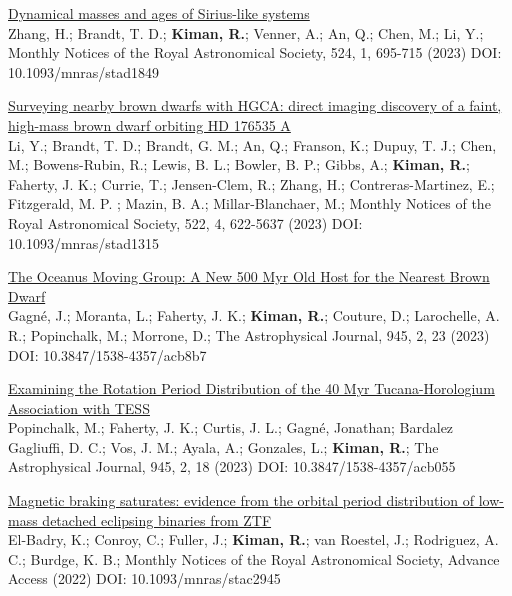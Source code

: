 \documentclass[10pt]{cv}
\begin{document}
\begin{llist}
\begin{etaremune}
 \item \href{https://ui.adsabs.harvard.edu/abs/2023MNRAS.524..695Z/abstract}{Dynamical masses and ages of Sirius-like systems} \\ Zhang, H.; Brandt, T. D.; \textbf{Kiman, R.}; Venner, A.; An, Q.; Chen, M.; Li, Y.; Monthly Notices of the Royal Astronomical Society, 524, 1, 695-715 (2023) DOI: 10.1093/mnras/stad1849

 \item \href{https://ui.adsabs.harvard.edu/abs/2023MNRAS.522.5622L/abstract}{Surveying nearby brown dwarfs with HGCA: direct imaging discovery of a faint, high-mass brown dwarf orbiting HD 176535 A} \\ Li, Y.; Brandt, T. D.; Brandt, G. M.; An, Q.; Franson, K.; Dupuy, T. J.; Chen, M.; Bowens-Rubin, R.; Lewis, B. L.; Bowler, B. P.; Gibbs, A.; \textbf{Kiman, R.}; Faherty, J. K.; Currie, T.; Jensen-Clem, R.; Zhang, H.; Contreras-Martinez, E.; Fitzgerald, M. P. ; Mazin, B. A.; Millar-Blanchaer, M.; Monthly Notices of the Royal Astronomical Society, 522, 4, 622-5637 (2023) DOI: 10.1093/mnras/stad1315

 \item \href{https://ui.adsabs.harvard.edu/abs/2023ApJ...945..119G/abstract}{The Oceanus Moving Group: A New 500 Myr Old Host for the Nearest Brown Dwarf} \\ Gagn\'e, J.; Moranta, L.; Faherty, J. K.; \textbf{Kiman, R.}; Couture, D.; Larochelle, A. R.; Popinchalk, M.; Morrone, D.; The Astrophysical Journal, 945, 2, 23 (2023) DOI: 10.3847/1538-4357/acb8b7

  \item \href{https://ui.adsabs.harvard.edu/abs/2023ApJ...945..114P/abstract}{Examining the Rotation Period Distribution of the 40 Myr Tucana-Horologium Association with TESS} \\ Popinchalk, M.; Faherty, J. K.; Curtis, J. L.; Gagn\'e, Jonathan; Bardalez Gagliuffi, D. C.; Vos, J. M.; Ayala, A.; Gonzales, L.; \textbf{Kiman, R.}; The Astrophysical Journal, 945, 2, 18 (2023) DOI: 10.3847/1538-4357/acb055

  \item \href{https://ui.adsabs.harvard.edu/abs/2022MNRAS.tmp.2758E/abstract}{Magnetic braking saturates: evidence from the orbital period distribution of low-mass detached eclipsing binaries from ZTF}\\ El-Badry, K.; Conroy, C.; Fuller, J.; \textbf{Kiman, R.}; van Roestel, J.; Rodriguez, A. C.; Burdge, K. B.; Monthly Notices of the Royal Astronomical Society, Advance Access (2022) DOI: 10.1093/mnras/stac2945
  

\end{etaremune}
\end{llist}
\end{document}
